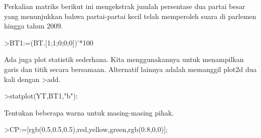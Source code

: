 \documentclass[a4paper,10pt]{article}
\begin{document}
\begin{eulernotebook}
\begin{eulercomment}
\begin{eulercomment}
\begin{eulercomment}
\begin{eulercomment}
\begin{eulercomment}
\begin{eulercomment}
\begin{eulercomment}
\begin{eulercomment}
\begin{eulercomment}
\begin{eulercomment}
\begin{eulercomment}
\begin{eulercomment}
\begin{eulercomment}
\begin{eulercomment}
\begin{eulercomment}
\begin{eulercomment}
\begin{eulercomment}
\begin{eulercomment}
\begin{eulercomment}
\begin{eulercomment}
\begin{eulercomment}
\begin{eulercomment}
\begin{eulercomment}
\begin{eulercomment}
\begin{eulercomment}
\begin{eulercomment}
\begin{eulercomment}
\begin{eulercomment}
\begin{eulercomment}
\begin{eulercomment}
\begin{eulercomment}
\begin{eulercomment}
\begin{eulercomment}
\begin{eulercomment}
\begin{eulercomment}
\begin{eulercomment}
\begin{eulercomment}
\begin{eulercomment}
\begin{eulercomment}
\begin{eulercomment}
\begin{eulercomment}
\begin{eulercomment}
\begin{eulercomment}
\begin{eulercomment}
\begin{euleroutput}
\end{euleroutput}
\begin{eulercomment}
Perkalian matriks berikut ini mengekstrak jumlah persentase dua partai
besar yang menunjukkan bahwa partai-partai kecil telah memperoleh
suara di parlemen hingga tahun 2009.
\end{eulercomment}
\begin{eulerprompt}
>BT1:=(BT.[1;1;0;0;0])'*100
\end{eulerprompt}
\begin{euleroutput}
  [84.29,  81.25,  81.1659,  82.7529,  72.9642,  61.8971,  79.8732]
\end{euleroutput}
\begin{eulercomment}
Ada juga plot statistik sederhana. Kita menggunakannya untuk
menampilkan garis dan titik secara bersamaan. Alternatif lainnya
adalah memanggil plot2d dua kali dengan \textgreater{}add.
\end{eulercomment}
\begin{eulerprompt}
>statplot(YT,BT1,"b"):
\end{eulerprompt}
\begin{eulercomment}
Tentukan beberapa warna untuk masing-masing pihak.
\end{eulercomment}
\begin{eulerprompt}
>CP:=[rgb(0.5,0.5,0.5),red,yellow,green,rgb(0.8,0,0)];
\end{eulerprompt}
\begin{eulercomment}

\end{eulercomment}
\end{eulercomment}
\end{eulercomment}
\end{eulercomment}
\end{eulercomment}
\end{eulercomment}
\end{eulercomment}
\end{eulercomment}
\end{eulercomment}
\end{eulercomment}
\end{eulercomment}
\end{eulercomment}
\end{eulercomment}
\end{eulercomment}
\end{eulercomment}
\end{eulercomment}
\end{eulercomment}
\end{eulercomment}
\end{eulercomment}
\end{eulercomment}
\end{eulercomment}
\end{eulercomment}
\end{eulercomment}
\end{eulercomment}
\end{eulercomment}
\end{eulercomment}
\end{eulercomment}
\end{eulercomment}
\end{eulercomment}
\end{eulercomment}
\end{eulercomment}
\end{eulercomment}
\end{eulercomment}
\end{eulercomment}
\end{eulercomment}
\end{eulercomment}
\end{eulercomment}
\end{eulercomment}
\end{eulercomment}
\end{eulercomment}
\end{eulercomment}
\end{eulercomment}
\end{eulercomment}
\end{eulercomment}
\end{eulercomment}
\end{eulernotebook}
\end{document}
